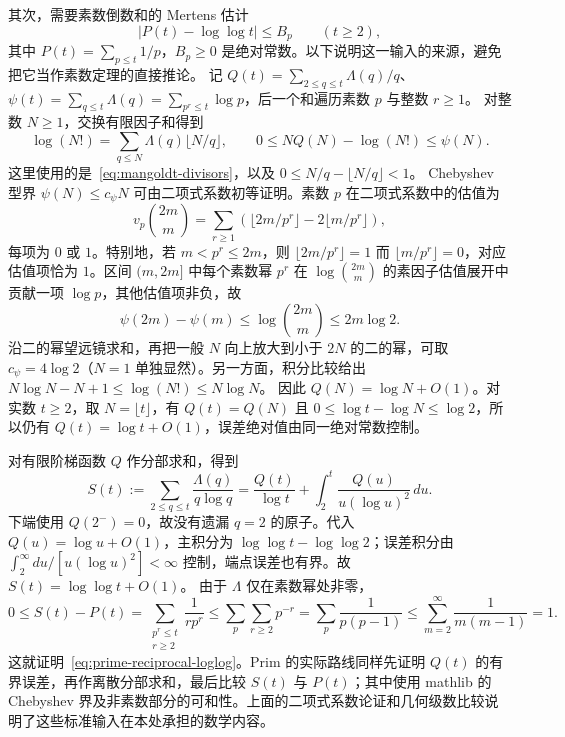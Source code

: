 其次，需要素数倒数和的 Mertens 估计
\begin{equation}\label{eq:prime-reciprocal-loglog}
 |P(t)-\log\log t|\le B_p\qquad(t\ge2),
\end{equation}
其中 $P(t)=\sum_{p\le t}1/p$，$B_p\ge0$ 是绝对常数。以下说明这一输入的来源，避免把它当作素数定理的直接推论。
记 $Q(t)=\sum_{2\le q\le t}\Lambda(q)/q$、$\psi(t)=\sum_{q\le t}\Lambda(q)=\sum_{p^r\le t}\log p$，后一个和遍历素数 $p$ 与整数 $r\ge1$。
对整数 $N\ge1$，交换有限因子和得到
\[
 \log(N!)=\sum_{q\le N}\Lambda(q)\lfloor N/q\rfloor,
 \qquad 0\le NQ(N)-\log(N!)\le\psi(N).
\]
这里使用的是~\eqref{eq:mangoldt-divisors}，以及 $0\le N/q-\lfloor N/q\rfloor<1$。
Chebyshev 型界 $\psi(N)\le c_\psi N$ 可由二项式系数初等证明。素数 $p$ 在二项式系数中的估值为
\[
 v_p\binom{2m}{m}=\sum_{r\ge1}
 \left(\lfloor2m/p^r\rfloor-2\lfloor m/p^r\rfloor\right),
\]
每项为 $0$ 或 $1$。特别地，若 $m<p^r\le2m$，则 $\lfloor2m/p^r\rfloor=1$ 而 $\lfloor m/p^r\rfloor=0$，对应估值项恰为 $1$。区间 $(m,2m]$ 中每个素数幂 $p^r$ 在
$\log\binom{2m}{m}$ 的素因子估值展开中贡献一项 $\log p$，其他估值项非负，故
\[
 \psi(2m)-\psi(m)\le\log\binom{2m}{m}\le2m\log2.
\]
沿二的幂望远镜求和，再把一般 $N$ 向上放大到小于 $2N$ 的二的幂，可取 $c_\psi=4\log2$（$N=1$ 单独显然）。另一方面，积分比较给出
$N\log N-N+1\le\log(N!)\le N\log N$。
因此 $Q(N)=\log N+O(1)$。对实数 $t\ge2$，取 $N=\lfloor t\rfloor$，有 $Q(t)=Q(N)$ 且 $0\le\log t-\log N\le\log2$，所以仍有
$Q(t)=\log t+O(1)$，误差绝对值由同一绝对常数控制。

对有限阶梯函数 $Q$ 作分部求和，得到
\[
 S(t):=\sum_{2\le q\le t}\frac{\Lambda(q)}{q\log q}
 =\frac{Q(t)}{\log t}+\int_2^t\frac{Q(u)}{u(\log u)^2}\,du.
\]
下端使用 $Q(2^-)=0$，故没有遗漏 $q=2$ 的原子。代入 $Q(u)=\log u+O(1)$，主积分为
$\log\log t-\log\log2$；误差积分由
$\int_2^\infty du/[u(\log u)^2]<\infty$ 控制，端点误差也有界。故 $S(t)=\log\log t+O(1)$。
由于 $\Lambda$ 仅在素数幂处非零，
\[
 0\le S(t)-P(t)
 =\sum_{\substack{p^r\le t\\r\ge2}}\frac1{r p^r}
 \le\sum_p\sum_{r\ge2}p^{-r}
 =\sum_p\frac1{p(p-1)}
 \le\sum_{m=2}^\infty\frac1{m(m-1)}=1.
\]
这就证明~\eqref{eq:prime-reciprocal-loglog}。Prim 的实际路线同样先证明 $Q(t)$ 的有界误差，再作离散分部求和，最后比较 $S(t)$ 与 $P(t)$；其中使用 mathlib 的 Chebyshev 界及非素数部分的可和性。上面的二项式系数论证和几何级数比较说明了这些标准输入在本处承担的数学内容。


